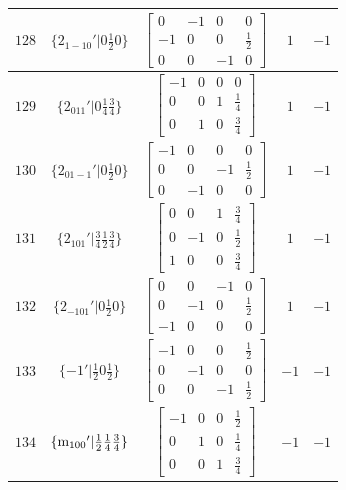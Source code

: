 \documentclass[fleqn,8pt]{jsarticle}
\begin{document}
\begin{longtable}{ccccc}
$ 128 $ & $ \{2{}_{1-10}{}'|0 \frac{1}{2} 0\} $ & $ \begin{bmatrix} 0 & -1 & 0 & 0 \\ -1 & 0 & 0 & \frac{1}{2} \\ 0 & 0 & -1 & 0 \end{bmatrix} $ & $ 1 $ & $ -1 $ \\ \hline
$ 129 $ & $ \{2{}_{011}{}'|0 \frac{1}{4} \frac{3}{4}\} $ & $ \begin{bmatrix} -1 & 0 & 0 & 0 \\ 0 & 0 & 1 & \frac{1}{4} \\ 0 & 1 & 0 & \frac{3}{4} \end{bmatrix} $ & $ 1 $ & $ -1 $ \\ \hline
$ 130 $ & $ \{2{}_{01-1}{}'|0 \frac{1}{2} 0\} $ & $ \begin{bmatrix} -1 & 0 & 0 & 0 \\ 0 & 0 & -1 & \frac{1}{2} \\ 0 & -1 & 0 & 0 \end{bmatrix} $ & $ 1 $ & $ -1 $ \\ \hline
$ 131 $ & $ \{2{}_{101}{}'|\frac{3}{4} \frac{1}{2} \frac{3}{4}\} $ & $ \begin{bmatrix} 0 & 0 & 1 & \frac{3}{4} \\ 0 & -1 & 0 & \frac{1}{2} \\ 1 & 0 & 0 & \frac{3}{4} \end{bmatrix} $ & $ 1 $ & $ -1 $ \\ \hline
$ 132 $ & $ \{2{}_{-101}{}'|0 \frac{1}{2} 0\} $ & $ \begin{bmatrix} 0 & 0 & -1 & 0 \\ 0 & -1 & 0 & \frac{1}{2} \\ -1 & 0 & 0 & 0 \end{bmatrix} $ & $ 1 $ & $ -1 $ \\ \hline
$ 133 $ & $ \{-1{}'|\frac{1}{2} 0 \frac{1}{2}\} $ & $ \begin{bmatrix} -1 & 0 & 0 & \frac{1}{2} \\ 0 & -1 & 0 & 0 \\ 0 & 0 & -1 & \frac{1}{2} \end{bmatrix} $ & $ -1 $ & $ -1 $ \\ \hline
$ 134 $ & $ \{{\rm m}_{100}{}'|\frac{1}{2} \frac{1}{4} \frac{3}{4}\} $ & $ \begin{bmatrix} -1 & 0 & 0 & \frac{1}{2} \\ 0 & 1 & 0 & \frac{1}{4} \\ 0 & 0 & 1 & \frac{3}{4} \end{bmatrix} $ & $ -1 $ & $ -1 $ \\ \hline

\end{longtable}
\end{document}

